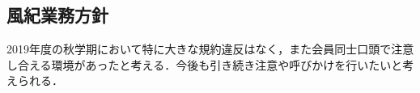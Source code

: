 \subsection*{風紀業務方針}

2019年度の秋学期において特に大きな規約違反はなく，また会員同士口頭で注意し合える環境があったと考える．今後も引き続き注意や呼びかけを行いたいと考えられる．
